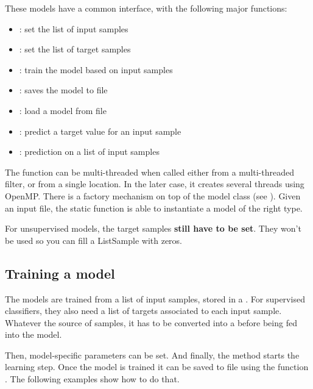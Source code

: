 These models have a common interface, with the following major functions:
\begin{itemize}
  \item {} : set the list of input samples
  \item {} : set the list of target samples
  \item {} : train the model based on input samples
  \item {} : saves the model to file
  \item {} : load a model from file
  \item {} : predict a target value for an input sample
  \item {} : prediction on a list of input samples
\end{itemize}

The  function can be multi-threaded when
called either from a multi-threaded filter, or from a single location. In
the later case, it creates several threads using OpenMP.
There is a factory mechanism on top of the model class (see
). Given an input file,
the static function  is able
to instantiate a model of the right type.

For unsupervised models, the target samples \textbf{still have to be set}. They
won't be used so you can fill a ListSample with zeros.

\subsection{Training a model}

The models are trained from a list of input samples, stored in a
. For supervised classifiers, they
also need a list of targets associated to each input sample. Whatever the
source of samples, it has to be converted into a  before
being fed into the model.

Then, model-specific parameters can be set. And finally, the 
method starts the learning step. Once the model is trained it can be saved
to file using the function . The following examples show how
to do that.



